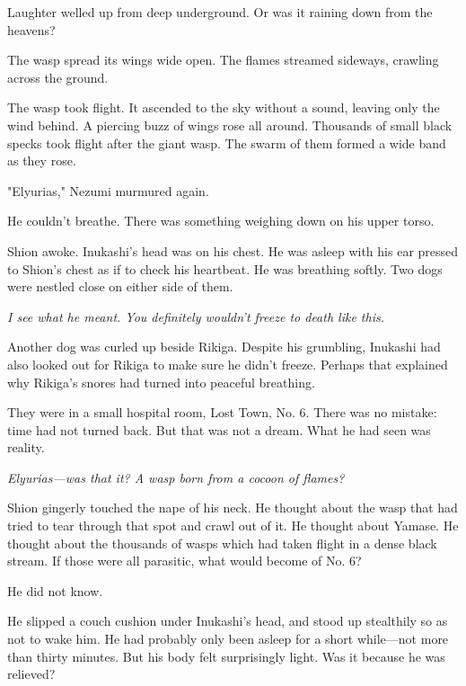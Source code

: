 Laughter welled up from deep underground. Or was it raining down from
the heavens?



The wasp spread its wings wide open. The flames streamed sideways,
crawling across the ground.



The wasp took flight. It ascended to the sky without a sound, leaving
only the wind behind. A piercing buzz of wings rose all around.
Thousands of small black specks took flight after the giant wasp. The
swarm of them formed a wide band as they rose.

"Elyurias," Nezumi murmured again.

\mybreak

He couldn't breathe. There was something weighing down on his upper
torso.

Shion awoke. Inukashi's head was on his chest. He was asleep with his
ear pressed to Shion's chest as if to check his heartbeat. He was
breathing softly. Two dogs were nestled close on either side of them.

\emph{I see what he meant. You definitely wouldn't freeze to death like this.}

Another dog was curled up beside Rikiga. Despite his grumbling, Inukashi
had also looked out for Rikiga to make sure he didn't freeze. Perhaps
that explained why Rikiga's snores had turned into peaceful breathing.

They were in a small hospital room, Lost Town, No. 6. There was no
mistake: time had not turned back. But that was not a dream. What he had
seen was reality.

\emph{Elyurias---was that it? A wasp born from a cocoon of flames?}

Shion gingerly touched the nape of his neck. He thought about the wasp
that had tried to tear through that spot and crawl out of it. He thought
about Yamase. He thought about the thousands of wasps which had taken
flight in a dense black stream. If those were all parasitic, what would
become of No. 6?

He did not know.

He slipped a couch cushion under Inukashi's head, and stood up
stealthily so as not to wake him. He had probably only been asleep for a
short while---not more than thirty minutes. But his body felt surprisingly
light. Was it because he was relieved?

